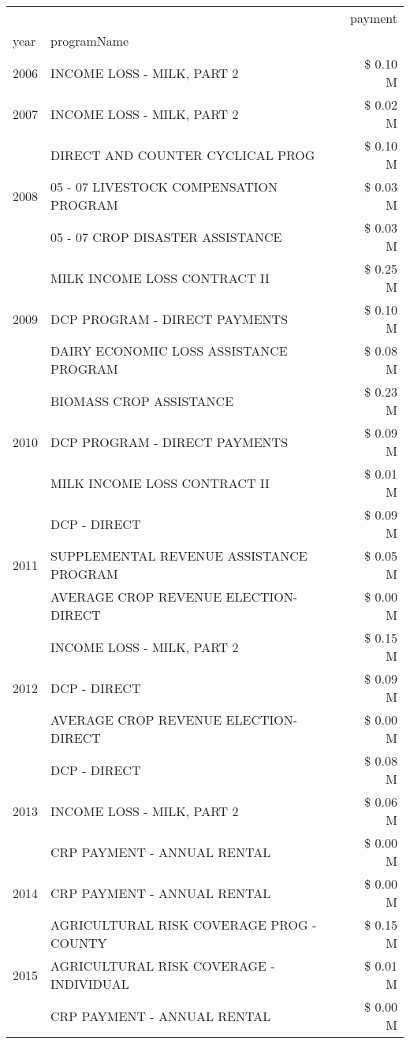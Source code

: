 \begin{tabular}{llr}
\toprule
 &  & payment \\
year & programName &  \\
\midrule
2006 & INCOME LOSS - MILK, PART 2 & \$ 0.10 M \\
\cline{1-3}
2007 & INCOME LOSS - MILK, PART 2 & \$ 0.02 M \\
\cline{1-3}
\multirow[t]{3}{*}{2008} & DIRECT AND COUNTER CYCLICAL PROG & \$ 0.10 M \\
 & 05 - 07 LIVESTOCK COMPENSATION PROGRAM & \$ 0.03 M \\
 & 05 - 07 CROP DISASTER ASSISTANCE & \$ 0.03 M \\
\cline{1-3}
\multirow[t]{3}{*}{2009} & MILK INCOME LOSS CONTRACT II & \$ 0.25 M \\
 & DCP PROGRAM - DIRECT PAYMENTS & \$ 0.10 M \\
 & DAIRY ECONOMIC LOSS ASSISTANCE PROGRAM & \$ 0.08 M \\
\cline{1-3}
\multirow[t]{3}{*}{2010} & BIOMASS CROP ASSISTANCE & \$ 0.23 M \\
 & DCP PROGRAM - DIRECT PAYMENTS & \$ 0.09 M \\
 & MILK INCOME LOSS CONTRACT II & \$ 0.01 M \\
\cline{1-3}
\multirow[t]{3}{*}{2011} & DCP - DIRECT & \$ 0.09 M \\
 & SUPPLEMENTAL REVENUE ASSISTANCE PROGRAM & \$ 0.05 M \\
 & AVERAGE CROP REVENUE ELECTION-DIRECT & \$ 0.00 M \\
\cline{1-3}
\multirow[t]{3}{*}{2012} & INCOME LOSS - MILK, PART 2 & \$ 0.15 M \\
 & DCP - DIRECT & \$ 0.09 M \\
 & AVERAGE CROP REVENUE ELECTION-DIRECT & \$ 0.00 M \\
\cline{1-3}
\multirow[t]{3}{*}{2013} & DCP - DIRECT & \$ 0.08 M \\
 & INCOME LOSS - MILK, PART 2 & \$ 0.06 M \\
 & CRP PAYMENT - ANNUAL RENTAL & \$ 0.00 M \\
\cline{1-3}
2014 & CRP PAYMENT - ANNUAL RENTAL & \$ 0.00 M \\
\cline{1-3}
\multirow[t]{3}{*}{2015} & AGRICULTURAL RISK COVERAGE PROG - COUNTY & \$ 0.15 M \\
 & AGRICULTURAL RISK COVERAGE - INDIVIDUAL & \$ 0.01 M \\
 & CRP PAYMENT - ANNUAL RENTAL & \$ 0.00 M \\
\cline{1-3}

\end{tabular}
